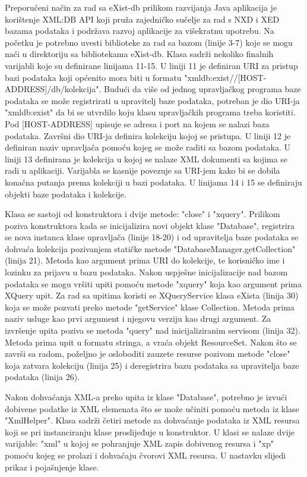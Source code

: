 \documentclass{foi}
\begin{document}
Preporučeni način za rad sa eXist-db prilikom razvijanja Java aplikacija je korištenje XML:DB API koji pruža zajedničko sučelje za rad s NXD i XED bazama podataka i podržava razvoj aplikacije za višekratnu upotrebu. Na početku je potrebno uvesti biblioteke za rad sa bazom (linije 3-7) koje se mogu naći u direktoriju sa bibliotekama eXist-db. Klasa sadrži nekoliko finalnih varijabli koje su definirane linijama 11-15. U liniji 11 je definiran URI za pristup bazi podataka koji općenito mora biti u formatu "xmldb:exist//[HOST-ADDRESS]/db/kolekcija". Budući da više od jednog upravljačkog programa baze podataka se može registrirati u upravitelj baze podataka, potreban je dio URI-ja "xmldb:exist" da bi se utvrdilo koju klasu upravljačkih programa treba koristiti. Pod [HOST-ADDRESS] upisuje se adresa i port na kojem se nalazi baza podataka. Završni dio URI-ja definira kolekciju kojoj se pristupa. \cite{existdb-java} U liniji 12 je definiran naziv upravljača pomoću kojeg se može raditi sa bazom podataka. U liniji 13 definirana je kolekcija u kojoj se nalaze XML dokumenti sa kojima se radi u aplikaciji. Varijabla se kasnije povezuje sa URI-jem kako bi se dobila konačna putanja prema kolekciji u bazi podataka. U linijama 14 i 15 se definiraju objekti baze podataka i kolekcije.

Klasa se sastoji od konstruktora i dvije metode: "close" i "xquery". Prilikom poziva konstruktora kada se inicijalizira novi objekt klase "Database", registrira se nova instanca klase upravljača (linije 18-20) i od upravitelja baze podataka se dohvaća kolekcija pozivanjem statičke metode "DatabaseManager.getCollection" (linija 21). Metoda kao argument prima URI do kolekcije, te korisničko ime i lozinku za prijavu u bazu podataka. Nakon uspješne inicijalizacije nad bazom podataka se mogu vršiti upiti pomoću metode "xquery" koja kao argument prima XQuery upit.  Za rad sa upitima koristi se XQueryService klasa eXista (linija 30) koja se može pozvati preko metode "getService" klase Collection. Metoda prima naziv usluge kao prvi argument i njegovu verziju kao drugi argument.  Za izvršenje upita poziva se metoda "query" nad inicijaliziranim servisom (linija 32). Metoda prima upit u formatu stringa, a vraća objekt ResourceSet. Nakon što se završi sa radom, poželjno je osloboditi zauzete resurse pozivom metode "close" koja zatvara kolekciju (linija 25) i deregistrira bazu podataka sa upravitelja baze podataka (linija 26).

Nakon dohvaćanja XML-a preko upita iz klase "Database", potrebno je izvući dobivene podatke iz XML elemenata što se može učiniti pomoću metoda iz klase "XmlHelper". Klasa sadrži četiri metode za dohvaćanje podataka iz XML resursa koji se pri instanciranju klase proslijeđuje u konstruktor. U klasi se nalaze dvije varijable: "xml" u kojoj se pohranjuje XML zapis dobivenog resursa i "xp" pomoću kojeg se prolazi i dohvaćaju čvorovi XML resursa. U nastavku slijedi prikaz i pojašnjenje klase.
\end{document}
